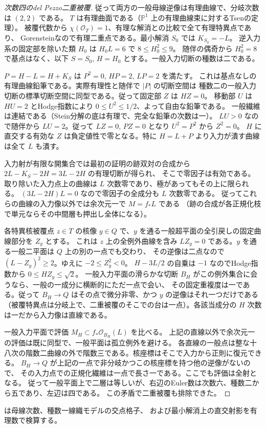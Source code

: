 \begin{proof}[次数四のdel Pezzo二重被覆]
従って両方の一般母線逆像は有理曲線で、分岐次数は $(2,2)$ である。
$T$ は有理曲面である（$\mathbb P^1$ 上の有理曲線束に対するTsenの定理）。
被覆代数から $\chi(\mathcal O_T)=1$、有理な解消との比較で全て有理特異点であり、
Gorensteinなので有理二重点である。最小解消 $S_0$ では $K_{S_0}=-L$。
逆入力系の固定部を除いた類 $H_0$ は $H_0 L=6$ で $8\le H_0^2\le9$。
随伴の偶奇から $H_0^2=8$ で基点はなく、以下 $S=S_0$, $H=H_0$ とする。一般入力切断の種数は二である。

$P=H-L=H+K_S$ は $P^2=0$, $HP=2$, $LP=2$ を満たす。
これは基点なしの有理曲線鉛筆である。実際有理性と随伴で $|P|$ の切断空間は
種数二の一般入力切断の標準切断空間に同型である。従って固定部 $Z$ は $HZ=0$。
移動部 $U$ は $HU=2$ とHodge指数により $0\le U^2\le1/2$、よって自由な鉛筆である。
一般繊維は連結である（Stein分解の底は有理で、完全な鉛筆の次数は一）。
$LU>0$ なので随伴から $LU=2$。従って $LZ=0$, $PZ=0$ となり $U^2=P^2$ から $Z^2=0$。
$H$ に直交する有効な $Z$ は負定値性で零となる。特に $H=L+P$ より入力が潰す曲線は全て $L$ も潰す。

入力射が有限な開集合では最初の証明の跡双対の合成から $2L-K_S-2H=3L-2H$ の有理切断が得られ、
そこで零因子は有効である。取り除いた入力点上の曲線は $L$ 次数零であり、極があってもその上に限られる。
$(3L-2H)L=0$ なので零因子の全成分も $L$ 次数零である。
従ってこれらの曲線の入力像以外では余次元一で $M=f_*L$ である
（跡の合成が各正規化枝で単元ならその中間層も押出し全体になる）。

各特異核被覆点 $z\in T$ の核像 $y\in Q$ で、$y$ を通る一般超平面の全引戻しの固定曲線部分を $Z_y$ とする。
これは $z$ 上の全例外曲線を含み $LZ_y=0$ である。$y$ を通る一般二平面は $Q$ 上の別の一点でも交わり、
その逆像は二点なので $(L-Z_y)^2\ge2$。ゆえに $-2\le Z_y^2<0$。
$H-3L/2$ の自乗は $-1$ なのでHodge指数から $0\le HZ_y\le\sqrt2$。
一般入力平面の滑らかな切断 $B_H$ がこの例外集合に会うなら、一般の一成分に横断的にただ一点で会い、
その固定重複度は一である。従って $B_H\to Q$ はその点で微分非零、かつ $y$ の逆像はそれ一つだけである
（被覆特異点は分岐上で、二重被覆のそこでの台は一点）。各該当成分の $H$ 次数は一だから入力像は直線である。

一般入力平面で評価 $M_H\subset f_*\mathcal O_{B_H}(L)$ を比べる。
上記の直線以外で余次元一の評価は既に同型で、一般平面は孤立例外を避ける。
各直線の一般点は整な十八次の階数二曲線の外で階数三である。核座標はそこで入力から正則に復元できる。
$B_H\to Q$ が上記の一点で非分岐かつこの核座標を持つ他の逆像がないので、
その入力点での正規化繊維は一点で長さ一である。ここでも評価は全射となる。
従って一般平面上で二層は等しいが、右辺のEuler数は次数六、種数二から五であり、左辺は四である。
この矛盾で二重被覆も排除できた。
\end{proof}
 は母線次数、種数一線織モデルの交点格子、
および最小解消上の直交射影を有理数で検算する。
